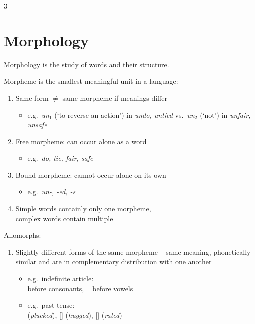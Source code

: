 \documentclass[12pt, a4paper]{article}
\begin{document}
\begin{multicols*}{3}
\colbreak
\section{Morphology}
Morphology is the study of words and their structure.

Morpheme is the smallest meaningful unit in a language:
\begin{enumerate}[\roman*.]
  \item Same form $\neq$ same morpheme if meanings differ 
    \begin{itemize}[leftmargin=*]\vspace{3pt}
      \item e.g.\ \textit{un$_1$} (`to reverse an action') in \textit{undo, untied} vs.\ \textit{un$_2$} (`not') in \textit{unfair, unsafe}
    \end{itemize}
  \item Free morpheme: can occur alone as a word     
    \begin{itemize}[leftmargin=*]\vspace{3pt}
      \item e.g.\ \textit{do, tie, fair, safe} 
    \end{itemize}
  \item Bound morpheme: cannot occur alone on its own
    \begin{itemize}[leftmargin=*]\vspace{3pt}
      \item e.g.\ \textit{un-, -ed, -s}
    \end{itemize}
  \item Simple words containly only one morpheme,\\complex words contain multiple
\end{enumerate}

Allomorphs:
\begin{enumerate}[\roman*.]
  \item Slightly different forms of the same morpheme -- same meaning, phonetically similar and are in complementary distribution with one another
    \begin{itemize}[leftmargin=*]\vspace{3pt}
      \item e.g.\ indefinite article:\\\textipa{[@]} before consonants, [] before vowels
      \item e.g.\ past tense:\\ \textipa{[t]} (\textit{plucked}), [] (\textit{hugged}), [] (\textit{rated})


\end{itemize}
\end{enumerate}
\end{multicols*}
\end{document}
